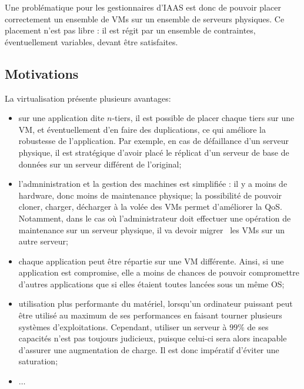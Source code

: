\documentclass[a4paper]{article}
\begin{document}
Une problématique pour les gestionnaires d'IAAS est donc de pouvoir placer
correctement un ensemble de VMs sur un ensemble de serveurs physiques.
Ce placement n'est pas libre : il est régit par un ensemble de contraintes,
éventuellement variables, devant être satisfaites.

\subsection{Motivations}
La virtualisation présente plusieurs avantages:
\begin{itemize}
	\item sur une application dite $n$-tiers, il est possible
	de placer chaque tiers sur une VM, et éventuellement d'en faire
	des duplications, ce qui améliore la robustesse de l'application.
	Par exemple, en cas de défaillance d'un serveur physique, il est
	stratégique d'avoir placé le réplicat d'un serveur de base de
	données sur un serveur différent de l'original;
	\item l'admninistration et la gestion des machines est simplifiée :
	il y a moins de hardware, donc moins de maintenance physique;
	la possibilité de pouvoir cloner, charger, décharger à la volée des
	VMs permet d'améliorer la QoS. Notamment, dans le cas
	où l'administrateur doit effectuer une opération de maintenance sur
	un serveur physique, il va devoir migrer~\cite{clark2005live} les VMs
	sur un autre serveur;
	\item chaque application peut être répartie sur une VM différente.
	Ainsi, si une application est compromise, elle a moins de chances
	de pouvoir compromettre d'autres applications que si elles étaient
	toutes lancées sous un même OS;
	\item utilisation plus performante du matériel, lorsqu'un ordinateur
	puissant peut être utilisé au maximum de ses performances en faisant
	tourner plusieurs systèmes d'exploitations. Cependant, utiliser un
	serveur à $99\%$ de ses capacités n'est pas toujours judicieux, puisque celui-ci
	sera alors incapable d'assurer une augmentation de charge. Il est donc
	impératif d'éviter une saturation;
	\item $\ldots$
\end{itemize}

\end{document}
